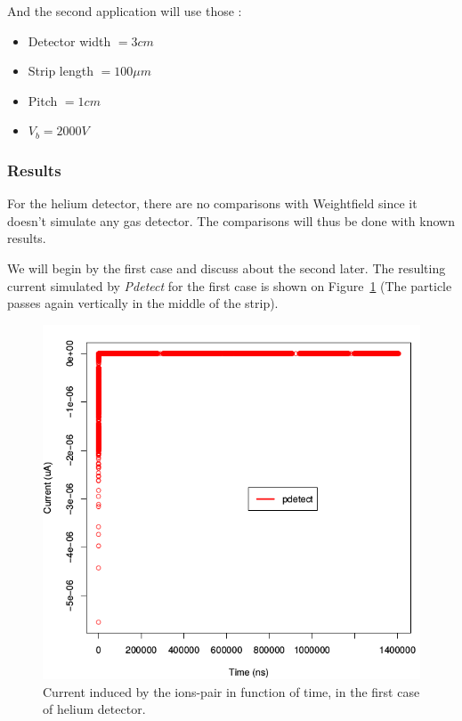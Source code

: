 \documentclass[11pt]{article}
\begin{document}
			And the second application will use those :

			\begin{itemize}

				\item Detector width $= 3 cm$
				\item Strip length $= 100 \mu m$
				\item Pitch $= 1 cm$
				\item $V_b = 2000 V$

			\end{itemize}

		\subsubsection*{Results}

			For the helium detector, there are no comparisons with Weightfield since it doesn't simulate
			any gas detector. The comparisons will thus be done with known results.

			We will begin by the first case and discuss about the second later.
			The resulting current simulated by \textit{Pdetect} for the first case is shown on
			Figure~\ref{fig:helium1_unprecise} (The particle passes again vertically in the middle of
			the strip).

			\begin{figure}[H]
			  \center
			  \includegraphics[scale=0.5]{images/applications/helium1_unprecise.png}
			  \caption{Current induced by the ions-pair in function of time, in the first case of helium detector.}
			  \label{fig:helium1_unprecise}
			\end{figure}
\end{document}
